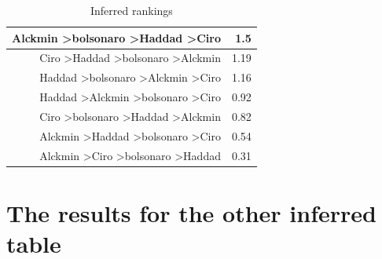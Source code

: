 \documentclass[hidelinks,11pt]{article}
\begin{document}
\begin{table}[H]
\begin{tabular}{|r|r|}
Alckmin \textgreater bolsonaro \textgreater Haddad \textgreater Ciro & 1.5                                  \\ \hline
Ciro \textgreater Haddad \textgreater bolsonaro \textgreater Alckmin & 1.19                                 \\ \hline
Haddad \textgreater bolsonaro \textgreater Alckmin \textgreater Ciro & 1.16                                 \\ \hline
Haddad \textgreater Alckmin \textgreater bolsonaro \textgreater Ciro & 0.92                                 \\ \hline
Ciro \textgreater bolsonaro \textgreater Haddad \textgreater Alckmin & 0.82                                 \\ \hline
Alckmin \textgreater Haddad \textgreater bolsonaro \textgreater Ciro & 0.54                                 \\ \hline
Alckmin \textgreater Ciro \textgreater bolsonaro \textgreater Haddad & 0.31                                 \\ \hline
\end{tabular}
\caption{Inferred rankings}
\label{lab:inferred1}
\end{table}


\section{The results for the other inferred table}\label{appendix:transfer2_results}
\end{document}
